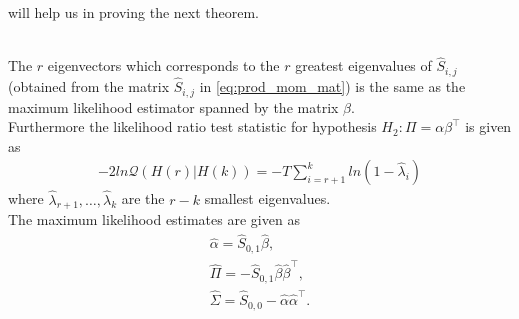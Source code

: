 will help us in proving the next theorem.
\begin{thm}{\phantom}\\
    The $r$ eigenvectors which corresponds to the $r$ greatest eigenvalues of $\hat{S}_{i,j}$ (obtained from the matrix $\hat{S}_{i,j}$ in \eqref{eq:prod_mom_mat}) is the same as the maximum likelihood estimator spanned by the matrix $\beta$.\\
    Furthermore the likelihood ratio test statistic for hypothesis $H_2:\Pi=\alpha\beta^{\top}$ is given as 
    \begin{align}\label{eq:lrmax_coint_r}
        -2ln\mathcal{Q}(H(r)|H(k))=-T\sum_{i=r+1}^k ln(1-\hat{\lambda}_i)
    \end{align}
    where $\hat{\lambda}_{r+1},\ldots,\hat{\lambda}_{k}$ are the $r-k$ smallest eigenvalues.\\
    The maximum likelihood estimates are given as
    \begin{align*}
        \hat{\alpha}=\hat{S}_{0,1}\hat{\beta},\\
        \hat{\Pi}=-\hat{S}_{0,1}\hat{\beta}\hat{\beta}^\top,\\
        \hat{\Sigma}=\hat{S}_{0,0}-\hat{\alpha}\hat{\alpha}^\top.
    \end{align*}
\end{thm}
